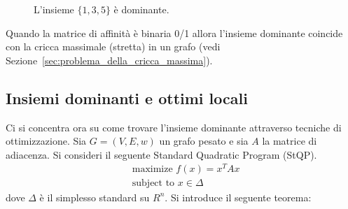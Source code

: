 \begin{figure}[h!]
    \centering
	
	\caption{L'insieme $\{1,3,5\}$ è dominante.}
\end{figure}

Quando la matrice di affinità è binaria 0/1 allora l'insieme dominante coincide con la cricca massimale (stretta) in un grafo (vedi Sezione~\ref{sec:problema_della_cricca_massima}).\\

\newpage

\subsection{Insiemi dominanti e ottimi locali} %
\label{sub:insiemi_dominanti_e_ottimi_locali}
Ci si concentra ora su come trovare l'insieme dominante attraverso tecniche di ottimizzazione.
Sia $G = (V, E, w)$ un grafo pesato e sia $A$ la matrice di adiacenza. Si consideri il seguente Standard Quadratic Program (StQP).
\begin{align*}
	&\text{maximize } f(x) = x^T A x\\
	&\text{subject to } x \in \Delta
\end{align*}
dove $\Delta$ è il simplesso standard su $R^n$. Si introduce il seguente teorema:

